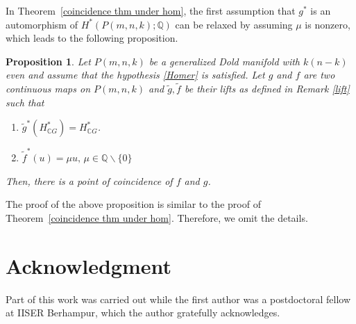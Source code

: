 \documentclass{amsart}
\newtheorem{proposition}[theorem]{Proposition}
\newcommand{\thmref}[1]{Theorem~\ref{#1}}
\begin{document}
In \thmref{coincidence thm under hom}, the first assumption that $g^*$ is an automorphism %
of $H^*(P(m,n,k); \mathbb{Q})$ can %
be relaxed by assuming $\mu$ is nonzero, which leads %
to the following proposition. 
\begin{proposition}
	Let %
$P(m,n,k)$ be a generalized Dold manifold with $k(n-k)$ even and assume that the hypothesis \eqref{Homer} is satisfied. Let $g$ and $f$ are two continuous maps on $P(m,n,k)$ and $\tilde g, \tilde f$ be their lifts as defined in  Remark \ref{lift} such %
that
	\begin{enumerate}
		\item $\tilde g^*(H^*_{\mathbb CG})= H^*_{\mathbb CG}$.
		\item $\tilde f^*(u)=\mu u,\, \mu\in \mathbb Q\backslash \{0\}$ %
	\end{enumerate}
Then, there is a point of coincidence of $f$ and  $g$.
\end{proposition}
The proof of the above proposition is similar to the proof of \thmref{coincidence thm under hom}. Therefore, we omit the %
details.

\section*{Acknowledgment}
Part %
of this work was carried out while the first author was a postdoctoral fellow at IISER Berhampur, which the author gratefully acknowledges.
\end{document}
